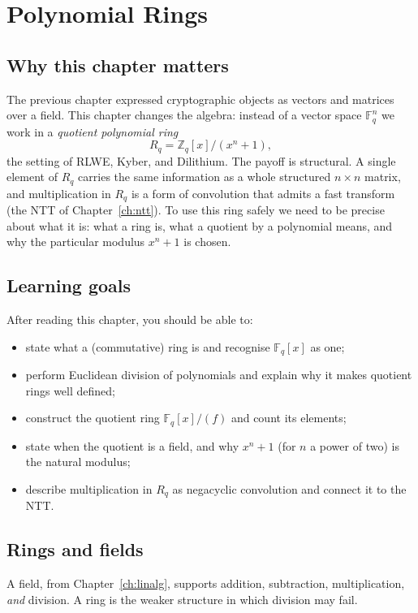 \chapter{Polynomial Rings}
\label{ch:polyring}

\section{Why this chapter matters}
The previous chapter expressed cryptographic objects as vectors and matrices over a field. This chapter changes the algebra: instead of a vector space $\mathbb{F}_q^n$ we work in a \emph{quotient polynomial ring}
\[
R_q = \mathbb{Z}_q[x]/(x^n+1),
\]
the setting of RLWE, Kyber, and Dilithium. The payoff is structural. A single element of $R_q$ carries the same information as a whole structured $n\times n$ matrix, and multiplication in $R_q$ is a form of convolution that admits a fast transform (the NTT of Chapter~\ref{ch:ntt}). To use this ring safely we need to be precise about what it is: what a ring is, what a quotient by a polynomial means, and why the particular modulus $x^n+1$ is chosen.

\section{Learning goals}
After reading this chapter, you should be able to:

\begin{itemize}
  \item state what a (commutative) ring is and recognise $\mathbb{F}_q[x]$ as one;
  \item perform Euclidean division of polynomials and explain why it makes quotient rings well defined;
  \item construct the quotient ring $\mathbb{F}_q[x]/(f)$ and count its elements;
  \item state when the quotient is a field, and why $x^n+1$ (for $n$ a power of two) is the natural modulus;
  \item describe multiplication in $R_q$ as negacyclic convolution and connect it to the NTT.
\end{itemize}

\section{Rings and fields}
A field, from Chapter~\ref{ch:linalg}, supports addition, subtraction, multiplication, \emph{and} division. A ring is the weaker structure in which division may fail.

